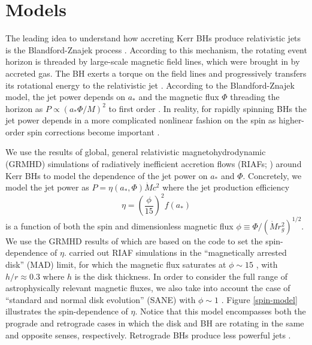 \documentclass[twocolumn, linenumbers]{aastex62} %
\begin{document}





\section{Models}    \label{models}

The leading idea to understand how accreting Kerr BHs produce relativistic jets is the Blandford-Znajek process \citep{Blandford1977, Blandford2019}. According to this mechanism, the rotating event horizon is threaded by large-scale magnetic field lines, which were brought in by accreted gas. %
The BH exerts a torque on the field lines and progressively transfers its rotational energy to the relativistic jet . According to the Blandford-Znajek model, the jet power depends on $a_*$ and the magnetic flux $\Phi$ threading the horizon as $P \propto ( a_* \Phi/M )^2$ to first order \citep{Blandford1977}. In reality, for rapidly spinning BHs the jet power depends in a more complicated nonlinear fashion on the spin as higher-order spin corrections become important . 

We use the results of global, general relativistic magnetohydrodynamic (GRMHD) simulations of radiatively inefficient accretion flows (RIAFs; \citealt{Yuan2014}) around Kerr BHs to model the dependence of the jet power on $a_*$ and $\Phi$. Concretely, we model the jet power as $P = \eta(a_*, \Phi) \dot{M} c^2$ where the jet production efficiency 
\begin{equation}
\eta = \left( \frac{\phi}{15} \right)^2 f(a_*)
\end{equation}
is a function of both the spin and dimensionless magnetic flux $\phi \equiv \Phi/(\dot{M} r_g^2)^{1/2}$. We use the GRMHD results of \cite{Sasha2012a} which are based on the  code \citep{Gammie2003} to set the spin-dependence of $\eta$. \cite{Sasha2012a} carried out RIAF simulations in the ``magnetically arrested disk'' (MAD) limit, for which the magnetic flux saturates at $\phi \sim 15$ \citep{Narayan2003, Sasha2011}, with $h/r \approx 0.3$ where $h$ is the disk thickness. In order to consider the full range of astrophysically relevant magnetic fluxes, we also take into account the case of  ``standard and normal disk evolution'' (SANE) with $\phi \sim 1$ . Figure  \ref{spin-model} illustrates the spin-dependence of $\eta$. Notice that this model encompasses both the prograde and retrograde cases in which the disk and BH are rotating in the same and opposite senses, respectively. Retrograde BHs produce less powerful jets \citep{Sasha2012}. 
\end{document}
